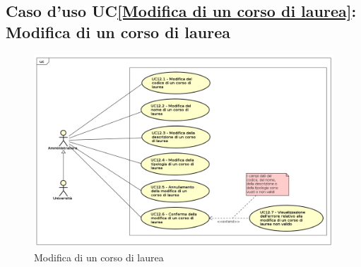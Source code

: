 \subsection{Caso d'uso UC\ref{Modifica di un corso di laurea}: Modifica di un corso di laurea}
\begin{figure} [H]
	\centering
	\includegraphics[scale=0.45]{./img/UseCaseDiagram012.png}
	\caption{Modifica di un corso di laurea}\label{}
\end{figure}
